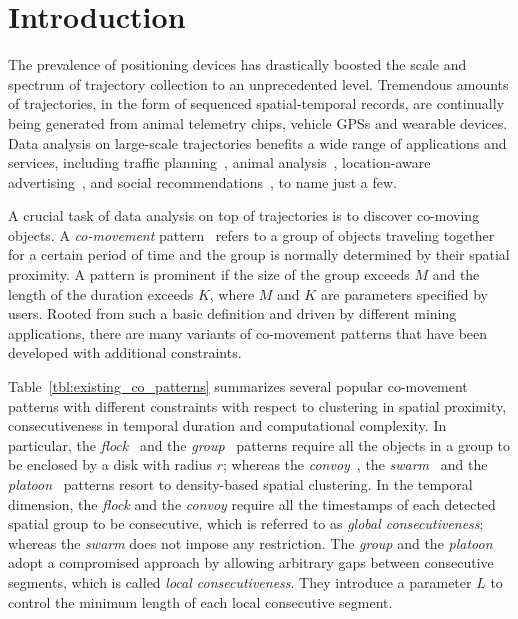 \section{Introduction}
The prevalence of positioning devices has drastically boosted 
the scale and spectrum of trajectory collection to an unprecedented level. 
Tremendous amounts of trajectories, in the form of sequenced spatial-temporal 
records, are continually being generated from animal telemetry chips, 
vehicle GPSs and wearable devices. Data analysis on large-scale 
trajectories benefits a wide range of applications and services, 
including traffic planning~\cite{zheng2011urban}, animal analysis~\cite{li2010miningperiodic}, location-aware advertising~\cite{guo2016influence},  and social recommendations~\cite{bao2013survey}, to name just a few.

A crucial task of data analysis on top of trajectories is 
to discover co-moving objects. A \emph{co-movement} pattern~\cite{li2013effective,zheng2015survey} 
refers to a group of objects traveling together for a certain period of time 
and the group is normally determined by their spatial proximity. 
A pattern is prominent if the size of the group exceeds $M$ and the length of the duration exceeds $K$, where $M$ and $K$ are parameters specified by users. Rooted from such a basic definition 
and driven by different mining applications, there are many variants 
of co-movement patterns that have been developed with additional constraints.

Table~\ref{tbl:existing_co_patterns} summarizes several popular co-movement patterns 
with different constraints with respect to clustering in spatial proximity,
consecutiveness in temporal duration and computational complexity. 
In particular,  the \emph{flock}~\cite{gudmundsson2006computing} 
and the \emph{group}~\cite{wang2006grouppattern} patterns require 
all the objects in a group to be enclosed by a disk with radius $r$; 
whereas the \emph{convoy}~\cite{jeung2008discovery}, the \emph{swarm}~\cite{li2010swarm} 
and the \emph{platoon}~\cite{li2015platoon} patterns resort to density-based 
spatial clustering. 
In the temporal dimension, the \emph{flock}%
and the \emph{convoy}%
require all the timestamps 
of each detected spatial group to be consecutive, which is referred to as \emph{global consecutiveness}; 
whereas the \emph{swarm}%
does not impose any restriction. 
The \emph{group}%
and the \emph{platoon}%
adopt a compromised approach by allowing
arbitrary gaps between consecutive segments, which is called \emph{local consecutiveness}. 
They introduce a parameter $L$ to control the minimum length of each local consecutive segment.


